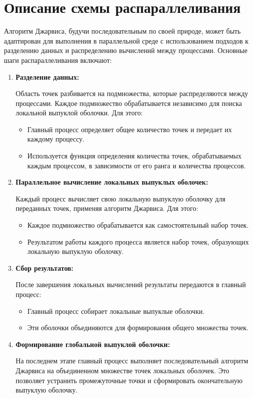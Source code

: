 \documentclass[a4paper,12pt]{article}
\begin{document}
\section{Описание схемы распараллеливания}
Алгоритм Джарвиса, будучи последовательным по своей природе, может быть адаптирован для выполнения в параллельной среде с использованием подходов к разделению данных и распределению вычислений между процессами. Основные шаги распараллеливания включают:
\begin{enumerate}
    \item \textbf{Разделение данных:}

Область точек разбивается на подмножества, которые распределяются между процессами. Каждое подмножество обрабатывается независимо для поиска локальной выпуклой оболочки. Для этого:
	\begin{itemize}
		\item Главный процесс определяет общее количество точек и передает их каждому процессу.
		\item Используется функция определения количества точек, обрабатываемых каждым процессом, в зависимости от его ранга и количества процессов.
	\end{itemize}
    \item \textbf{Параллельное вычисление локальных выпуклых оболочек:}

Каждый процесс вычисляет свою локальную выпуклую оболочку для переданных точек, применяя алгоритм Джарвиса. Для этого:
	\begin{itemize}
		\item Каждое подмножество обрабатывается как самостоятельный набор точек.
		\item Результатом работы каждого процесса является набор точек, образующих локальную выпуклую оболочку.
	\end{itemize}
    \item \textbf{Сбор результатов:}

После завершения локальных вычислений результаты передаются в главный процесс:
\begin{itemize}
		\item Главный процесс собирает локальные выпуклые оболочки.
		\item Эти оболочки объединяются для формирования общего множества точек.
	\end{itemize}
    \item \textbf{Формирование глобальной выпуклой оболочки:}

На последнем этапе главный процесс выполняет последовательный алгоритм Джарвиса на объединенном множестве точек локальных оболочек. Это позволяет устранить промежуточные точки и сформировать окончательную выпуклую оболочку.
\end{enumerate}
\end{document}
